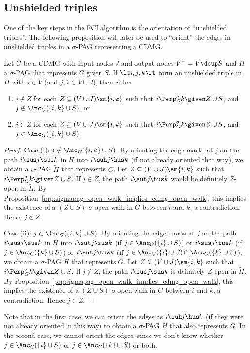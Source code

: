 \subsection{Unshielded triples}

One of the key steps in the FCI algorithm is the orientation of ``unshielded triples''.
The following proposition will later be used to ``orient'' the edges in unshielded triples in a $\sigma$-PAG representing a CDMG.
\begin{Prp}\label{prp:orienting_unshielded_triples}
  Let $G$ be a CDMG with input nodes $J$ and output nodes $V^+ = V \dcup S$ and $H$ a $\sigma$-PAG that represents $G$ given $S$.
  If $\lt i, j, k \rt$ form an unshielded triple in $H$ with $i \in V$ (and $j,k \in V \cup J$), then either 
  \begin{enumerate}[label=(\roman*)]
    \item $j \notin Z$ for each $Z \subseteq (V \cup J) \sm \{i,k\}$ such that $i \Perp^\sigma_G k \given Z \cup S$, and $j \notin \Anc_G(\{i,k\} \cup S)$, or
    \item $j \in Z$ for each $Z \subseteq (V \cup J) \sm \{i,k\}$ such that $i \Perp^\sigma_G k \given Z \cup S$, and $j \in \Anc_G(\{i,k\} \cup S)$.
  \end{enumerate}
\end{Prp}
\begin{proof}
  Case (i): $j \notin \Anc_G(\{i,k\} \cup S)$. 
  By orienting the edge marks at $j$ on the path $i \sus j \sus k$ in $H$ into $i \suh j \hus k$ (if not already oriented that way), we obtain a $\sigma$-PAG $\tilde{H}$ that represents $G$.
  Let $Z \subseteq (V \cup J) \sm \{i,k\}$ such that $i \Perp^\sigma_G k \given Z \cup S$. 
  If $j \in Z$, the path $i \suh j \hus k$ would be definitely $Z$-open in $\tilde{H}$.
  By Proposition~\ref{prp:sigmapag_open_walk_implies_cdmg_open_walk}, this implies the existence of a $(Z \cup S)$-$\sigma$-open walk in $G$ between $i$ and $k$, a contradiction.
  Hence $j \notin Z$.

  Case (ii): $j \in \Anc_G(\{i,k\} \cup S)$.
  By orienting the edge marks at $j$ on the path $i \sus j \sus k$ in $H$ into $i \sut j \sus k$ (if $j \in \Anc_G(\{i\} \cup S)$) or $i \sus j \tus k$ (if $j \in \Anc_G(\{k\} \cup S)$) or $i \sut j \tus k$ (if $j \in \Anc_G(\{i\} \cup S) \cap \Anc_G(\{k\} \cup S)$), we obtain a $\sigma$-PAG $\tilde{H}$ that represents $G$.
  Let $Z \subseteq (V \cup J) \sm \{i,k\}$ such that $i \Perp^\sigma_G k \given Z \cup S$. 
  If $j \notin Z$, the path $i \sus j \sus k$ is definitely $Z$-open in $\tilde{H}$.
  By Proposition~\ref{prp:sigmapag_open_walk_implies_cdmg_open_walk}, this implies the existence of a $(Z \cup S)$-$\sigma$-open walk in $G$ between $i$ and $k$, a contradiction.
  Hence $j \in Z$.
\end{proof}
Note that in the first case, we can orient the edges as $i \suh j \hus k$ (if they were not already oriented in this way) to obtain a $\sigma$-PAG $\tilde{H}$ that also represents $G$. 
In the second case, we cannot orient the edges, since we don't know whether $j \in \Anc_G(\{i\}\cup S)$ or $j \in \Anc_G(\{k\} \cup S)$ or both.

